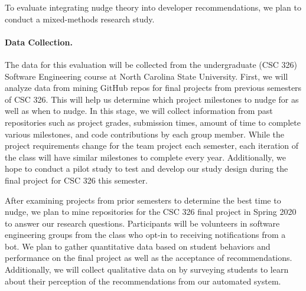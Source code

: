 To evaluate integrating nudge theory into developer recommendations, we plan to conduct a mixed-methods research study.

\paragraph{Data Collection.} The data for this evaluation will be collected from the undergraduate (CSC 326) Software Engineering course at North Carolina State University. First, we will analyze data from mining GitHub repos for final projects from previous semesters of CSC 326. This will help us determine which project milestones to nudge for as well as when to nudge. In this stage, we will collect information from past repositories such as project grades, submission times, amount of time to complete various milestones, and code contributions by each group member. While the project requirements change for the team project each semester, each iteration of the class will have similar milestones to complete every year. Additionally, we hope to conduct a pilot study to test \TOOL and develop our study design during the final project for CSC 326 this semester.

After examining projects from prior semesters to determine the best time to nudge, we plan to mine repositories for the CSC 326 final project in Spring 2020 to answer our research questions. Participants will be volunteers in software engineering groups from the class who opt-in to receiving notifications from a bot. We plan to gather quantitative data based on student behaviors and performance on the final project as well as the acceptance of recommendations. Additionally, we will collect qualitative data on by surveying students to learn about their perception of the recommendations from our automated system.

